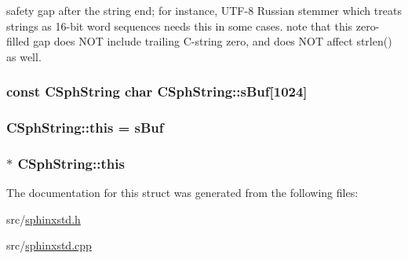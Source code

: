 safety gap after the string end; for instance, U\-T\-F-\/8 Russian stemmer which treats strings as 16-\/bit word sequences needs this in some cases. note that this zero-\/filled gap does N\-O\-T include trailing C-\/string zero, and does N\-O\-T affect strlen() as well. \hypertarget{structCSphString_a661025ca9389a788dad43bb9af8badd0}{
\subsubsection[{s\-Buf}]{\setlength{\rightskip}{0pt plus 5cm}const {\bf C\-Sph\-String} char C\-Sph\-String\-::s\-Buf\mbox{[}1024\mbox{]}}}\label{structCSphString_a661025ca9389a788dad43bb9af8badd0}
\hypertarget{structCSphString_a149e21dab338f7bb7fa0b67c3cc2ebe2}{
\subsubsection[{this}]{\setlength{\rightskip}{0pt plus 5cm}C\-Sph\-String\-::this = {\bf s\-Buf}}}\label{structCSphString_a149e21dab338f7bb7fa0b67c3cc2ebe2}
\hypertarget{structCSphString_a6f470005cfc9ae68b042b8faae2cc197}{
\subsubsection[{this}]{$\ast$ C\-Sph\-String\-::this}}\label{structCSphString_a6f470005cfc9ae68b042b8faae2cc197}


The documentation for this struct was generated from the following files\-:\begin{DoxyCompactItemize}
\item 
src/\hyperlink{sphinxstd_8h}{sphinxstd.\-h}\item 
src/\hyperlink{sphinxstd_8cpp}{sphinxstd.\-cpp}\end{DoxyCompactItemize}
